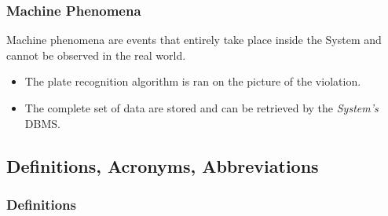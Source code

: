 \documentclass {article}
\begin{document}
		\subsubsection{Machine Phenomena}
		Machine phenomena are events that entirely take place inside the System and cannot be observed in the real world.
		\begin{itemize}
			\item The plate recognition algorithm is ran on the picture of the violation.
			\item The complete set of data are stored and can be retrieved by the {\it System's} DBMS.
		\end{itemize}



	\subsection{Definitions, Acronyms, Abbreviations}
					
		\subsubsection{Definitions}
			
\end{document}
